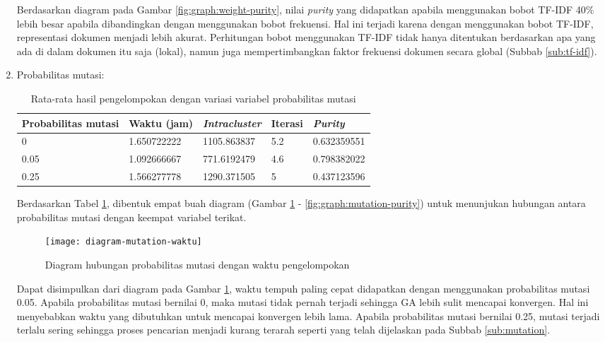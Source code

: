 \begin{enumerate}
		Berdasarkan diagram pada Gambar \ref{fig:graph:weight-purity}, nilai \textit{purity} yang didapatkan apabila menggunakan bobot TF-IDF 40\% lebih besar apabila dibandingkan dengan menggunakan bobot frekuensi. Hal ini terjadi karena dengan menggunakan bobot TF-IDF, representasi dokumen menjadi lebih akurat. Perhitungan bobot menggunakan TF-IDF tidak hanya ditentukan berdasarkan apa yang ada di dalam dokumen itu saja (lokal), namun juga mempertimbangkan faktor frekuensi dokumen secara global (Subbab \ref{sub:tf-idf}).
		
		\item Probabilitas mutasi:
		\begin{table}[H]
			\centering
			\begin{tabular}{|l|l|l|l|l|} \hline
				Probabilitas mutasi & Waktu (jam) & \textit{Intracluster} & Iterasi& \textit{Purity} \\ \hline
				0    & 1.650722222 & 1105.863837 & 5.2 & 0.632359551 \\ \hline
				0.05 & 1.092666667 & 771.6192479 & 4.6 & 0.798382022 \\ \hline
				0.25 & 1.566277778 & 1290.371505 & 5   & 0.437123596 \\ \hline
			\end{tabular}
			\caption{Rata-rata hasil pengelompokan dengan variasi variabel probabilitas mutasi}
			\label{tbl:exp-mutation}
		\end{table}
		
		Berdasarkan Tabel \ref{tbl:exp-mutation}, dibentuk empat buah diagram (Gambar \ref{fig:graph:mutation-time} - \ref{fig:graph:mutation-purity}) untuk menunjukan hubungan antara probabilitas mutasi dengan keempat variabel terikat.
		
		\begin{figure}[H]
			\centering
			\texttt{[image: diagram-mutation-waktu]}
			\caption{Diagram hubungan probabilitas mutasi dengan waktu pengelompokan}
			\label{fig:graph:mutation-time}
		\end{figure}
		
		Dapat disimpulkan dari diagram pada Gambar \ref{fig:graph:mutation-time}, waktu tempuh paling cepat didapatkan dengan menggunakan probabilitas mutasi 0.05. Apabila probabilitas mutasi bernilai 0, maka mutasi tidak pernah terjadi sehingga GA lebih sulit mencapai konvergen. Hal ini menyebabkan waktu yang dibutuhkan untuk mencapai konvergen lebih lama. Apabila probabilitas mutasi bernilai 0.25, mutasi terjadi terlalu sering sehingga proses pencarian menjadi kurang terarah seperti yang telah dijelaskan pada Subbab \ref{sub:mutation}.
		

\end{enumerate}
